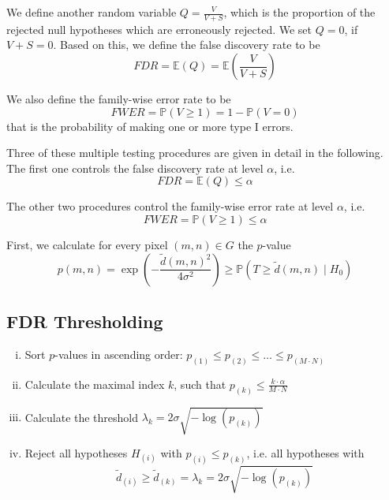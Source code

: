 \documentclass[a4paper,12pt]{article}
\theoremstyle{plain}
\theoremstyle{definition}
\theoremstyle{remark}
\begin{document}
We define another random variable $Q = \frac{V}{V + S}$, which is the proportion of the rejected null hypotheses which are erroneously rejected. We set $Q = 0$, if $V + S = 0$. Based on this, we define the false discovery rate to be
\begin{equation}
	FDR = \mathbb{E}(Q) = \mathbb{E} \left( \frac{V}{V + S} \right)
\end{equation}

We also define the family-wise error rate to be
\begin{equation}
	FWER = \mathbb{P}( V \geq 1 ) = 1 - \mathbb{P}( V = 0 )
\end{equation}
that is the probability of making one or more type I errors.

Three of these multiple testing procedures are given in detail in the following. The first one controls the false discovery rate at level $\alpha$, i.e.
\begin{equation}
	FDR = \mathbb{E}(Q) \leq \alpha
\end{equation}

The other two procedures control the family-wise error rate at level $\alpha$, i.e.
\begin{equation}
	FWER = \mathbb{P}( V \geq 1 ) \leq \alpha
\end{equation}

First, we calculate for every pixel $(m, n) \in G$ the $p$-value
\begin{equation}
	p(m, n) = \exp \left( - \frac{\tilde{d}(m, n)^2}{4 \sigma^2} \right) \geq \mathbb{P}(T \geq \tilde{d}(m, n) \mid H_0)
\end{equation}

\subsection{FDR Thresholding}
\begin{enumerate}[(i)]
	\item Sort $p$-values in ascending order: $p_{(1)} \leq p_{(2)} \leq \dots \leq p_{(M \cdot N)}$
	\item Calculate the maximal index $k$, such that $p_{(k)} \leq \frac{k \cdot \alpha}{M \cdot N}$
	\item Calculate the threshold $\lambda_{k} = 2 \sigma \sqrt{- \log(p_{(k)})}$
	\item Reject all hypotheses $H_{(i)}$ with $p_{(i)} \leq p_{(k)}$, i.e. all hypotheses with $$\tilde{d}_{(i)} \geq \tilde{d}_{(k)} = \lambda_{k} = 2 \sigma \sqrt{- \log(p_{(k)})}$$
\end{enumerate}
\end{document}
